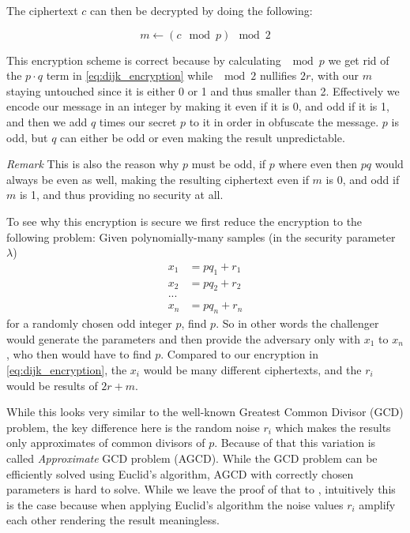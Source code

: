 The ciphertext $c$ can then be decrypted by doing the following:

\begin{equation}
    m \leftarrow \left( c \mod p \right) \mod 2
\end{equation}

This encryption scheme is correct because by calculating $\mod p$ we get rid of the $p \cdot q$ term in \ref{eq:dijk_encryption} while $\mod 2$ nullifies $2r$, with our $m$ staying untouched since it is either 0 or 1 and thus smaller than 2. Effectively we encode our message in an integer by making it even if it is 0, and odd if it is 1, and then we add $q$ times our secret $p$ to it in order in obfuscate the message. $p$ is odd, but $q$ can either be odd or even making the result unpredictable.

\emph{Remark} This is also the reason why $p$ must be odd, if $p$ where even then $pq$ would always be even as well, making the resulting ciphertext even if $m$ is 0, and odd if $m$ is 1, and thus providing no security at all.

To see why this encryption is secure we first reduce the encryption to the following problem: Given polynomially-many samples (in the security parameter $\lambda$)
\begin{align}
    x_1 &= p q_1 + r_1 \\
    x_2 &= p q_2 + r_2 \\
    ... &\\
    x_n &= p q_n + r_n
\end{align}
for a randomly chosen odd integer $p$, find $p$. So in other words the challenger would generate the parameters and then provide the adversary only with $x_1$ to $x_n$, who then would have to find $p$. Compared to our encryption in \ref{eq:dijk_encryption}, the $x_i$ would be many different ciphertexts, and the $r_i$ would be results of $2r + m$.

While this looks very similar to the well-known Greatest Common Divisor (GCD) problem, the key difference here is the random noise $r_i$ which makes the results only approximates of common divisors of $p$. Because of that this variation is called \emph{Approximate} GCD problem (AGCD). While the GCD problem can be efficiently solved using Euclid's algorithm, AGCD with correctly chosen parameters is hard to solve. While we leave the proof of that to \cite{van_dijk_fully_2010}, intuitively this is the case because when applying Euclid's algorithm the noise values $r_i$ amplify each other rendering the result meaningless.

